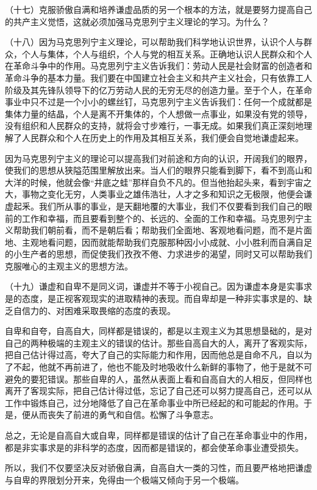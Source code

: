 （十七）克服骄傲自满和培养谦虚品质的另一个根本的方法，就是要努力提高自己的共产主义觉悟，这就必须加强马克思列宁主义理论的学习。为什么？

（十八）因为马克思列宁主义理论，可以帮助我们科学地认识世界，认识个人与群众，个人与集体，个人与组织，个人与党的相互关系。正确地认识人民群众和个人在革命斗争中的作用。马克思列宁主义告诉我们：劳动人民是社会财富的创造者和革命斗争的基本力量。我们要在中国建立社会主义和共产主义社会，只有依靠工人阶级及其先锋队领导下的亿万劳动人民的无穷无尽的创造力量。至于个人，在革命事业中只不过是一个小小的螺丝钉，马克思列宁主义告诉我们：任何一个成就都是集体力量的结晶，个人是离不开集体的，个人想做一点事业，如果没有党的领导，没有组织和人民群众的支持，就将会寸步难行，一事无成。如果我们真正深刻地理解了人民群众和个人在历史上的作用及其相互关系，我们便会自觉地谦虚起来。

因为马克思列宁主义的理论可以提高我们对前途和方向的认识，开阔我们的眼界，使我们的思想从狭隘范围里解放出来。当人们的眼界只能看到脚下，看不到高山和大洋的时候，他就会像“井底之蛙”那样自负不凡的。但当他抬起头来，看到宇宙之大，事物之变化无穷，人类事业之雄伟浩壮，人才之多和知识之无极限，他便会谦虚起釆。我们所从事的事业，是天翻地覆的大事业，我们不仅要看到我们自己的眼前的工作和幸福，而且要看到整个的、长远的、全面的工作和幸福。马克思列宁主义帮助我们朝前看，而不是朝后看；帮助我们全面地、客观地看问题，而不是片面地、主观地看问题，因而就能帮助我们克服那种因小小成就、小小胜利而自满自足的小生产者的思想，而促使我们孜孜不倦、力求进步的渴望，同时又可以帮助我们克服唯心的主观主义的思想方法。

（十九）谦虚和自卑不是同义词，谦虚并不等于小视自己。因为谦虚本身是实事求是的态度，是正视客观现实的进取精神的表现。而自卑却是一种非实事求是的、缺乏自信力的、对困难采取畏缩的态度的表现。

自卑和自夸，自高自大，同样都是错误的，都是以主观主义为其思想垦础的，是对自己的两种极端的主观主义的错误的估计。那些自高自大的人，离开了客观实际，把自己估计得过高，夸大了自己的实际能力和作用，因而他总是自命不凡，自以为了不起，他就不再前进了，他也不能及时地吸收什么新鲜的事物了，他于是就不可避免的要犯错误。那些自卑的人，虽然从表面上看和自高自大的人相反，但同样也离开了客现实际，把自己估计得过低，忘记了自己还可以努力提高自己，还可以从工作中锻炼自己，过分地降低了自己在革命事业中所已经起的和可能起的作用。于是，便从而丧失了前进的勇气和自信。松懈了斗争意志。

总之，无论是自高自大或自卑，同样都是错误的估计了自己在革命事业中的作用，都是非实事求是的非科学的态度，因而都是错误的，都会使革命事业遭受损失。

所以，我们不仅要坚决反对骄傲自满，自高自大一类的习性，而且要严格地把谦虚与自卑的界限划分开来，免得由一个极端又倾向于另一个极端。


